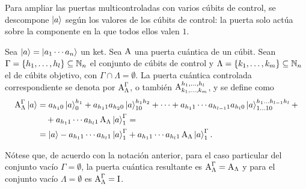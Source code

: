 Para ampliar las puertas multicontroladas con varios cúbits de control, se descompone $\ket{a}$ según los valores de los cúbits de control: la puerta solo actúa sobre la componente en la que todos ellos valen $1$.
\begin{notation}
  Sea $\ket{a}=\ket{a_1\cdots a_n}$ un ket.
  Sea $\text{A}$ una puerta cuántica de un cúbit.
  Sean $\Gamma=\{h_1,\dots,h_l\}\subseteq\mathbb{N}_n$ el conjunto de cúbits de control y $\Lambda=\{k_1,\dots,k_m\}\subseteq\mathbb{N}_n$ el de cúbits objetivo, con $\Gamma\cap\Lambda=\emptyset$.
  La puerta cuántica controlada correspondiente se denota por $\text{A}^{\Gamma}_{\Lambda}$, o también $\text{A}^{h_1,\dots,h_l}_{k_1,\dots, k_m}$, y se define como
  \begin{align*}
    \text{A}^{\Gamma}_{\Lambda}\ket{a}
     & =a_{h_{1}0}\ket{a}^{h_1}_{0}+a_{h_{1}1}a_{h_{2}0}\ket{a}^{h_{1}h_{2}}_{10}+\dots
    +a_{h_{1}1}\cdots a_{h_{l-1}1}a_{h_{l}0}\ket{a}^{h_{1}\dots h_{l-1}h_{l}}_{1\dots 10}+ \\
     & \quad+a_{h_{1}1}\cdots a_{h_{l}1}\,\text{A}_\Lambda\ket{a}^{\Gamma}_{1}=            \\
     & =\ket{a}-a_{h_{1}1}\cdots a_{h_{l}1}\ket{a}^{\Gamma}_{1}+a_{h_{1}1}\cdots a_{h_{l}1}\,\text{A}_\Lambda\ket{a}^{\Gamma}_{1}.
  \end{align*}
\end{notation}
Nótese que, de acuerdo con la notación anterior, para el caso particular del conjunto vacío $\Gamma=\emptyset$, la puerta cuántica resultante es $\text{A}^{\Gamma}_{\Lambda}=\text{A}_{\Lambda}$ y para el conjunto vacío $\Lambda = \emptyset$ es $\text{A}^{\Gamma}_{\Lambda}=\text{I}$.
